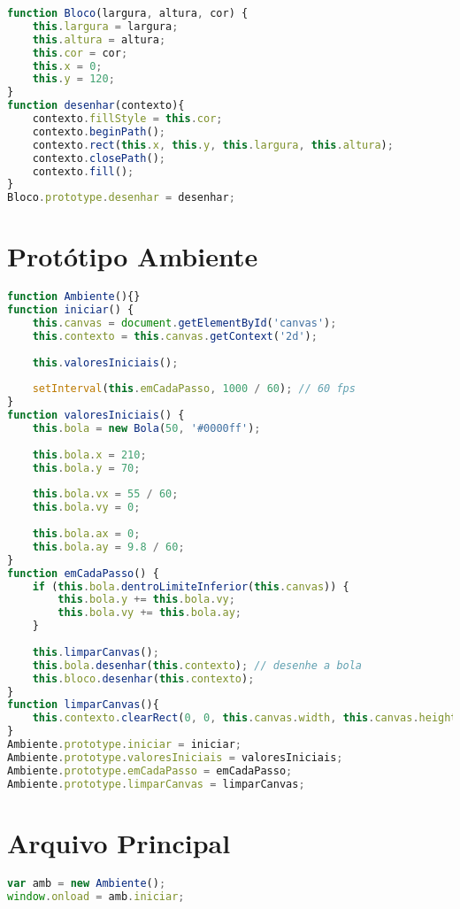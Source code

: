 \documentclass[12pt,a4paper,oneside]{article}
\begin{document}
\begin{lstlisting}[language=JavaScript]
function Bloco(largura, altura, cor) {
	this.largura = largura;
	this.altura = altura;
	this.cor = cor;
	this.x = 0;
	this.y = 120;
}
function desenhar(contexto){    
	contexto.fillStyle = this.cor;
	contexto.beginPath();    
	contexto.rect(this.x, this.y, this.largura, this.altura);
	contexto.closePath();
	contexto.fill();
}
Bloco.prototype.desenhar = desenhar;
\end{lstlisting}

\section*{Protótipo Ambiente}

\begin{lstlisting}[language=JavaScript]
function Ambiente(){}
function iniciar() {    
	this.canvas = document.getElementById('canvas');
	this.contexto = this.canvas.getContext('2d');
	
	this.valoresIniciais();
	
	setInterval(this.emCadaPasso, 1000 / 60); // 60 fps
}
function valoresIniciais() {
	this.bola = new Bola(50, '#0000ff');
	
	this.bola.x = 210;
	this.bola.y = 70;
	
	this.bola.vx = 55 / 60;
	this.bola.vy = 0;
	
	this.bola.ax = 0;
	this.bola.ay = 9.8 / 60;
}
function emCadaPasso() {    
	if (this.bola.dentroLimiteInferior(this.canvas)) {
		this.bola.y += this.bola.vy;
		this.bola.vy += this.bola.ay;
	} 
	
	this.limparCanvas();
	this.bola.desenhar(this.contexto); // desenhe a bola 
	this.bloco.desenhar(this.contexto);
}
function limparCanvas(){
	this.contexto.clearRect(0, 0, this.canvas.width, this.canvas.height);
}
Ambiente.prototype.iniciar = iniciar;
Ambiente.prototype.valoresIniciais = valoresIniciais;
Ambiente.prototype.emCadaPasso = emCadaPasso;
Ambiente.prototype.limparCanvas = limparCanvas;
\end{lstlisting}

\section*{Arquivo Principal}

\begin{lstlisting}[language=JavaScript]
var amb = new Ambiente();
window.onload = amb.iniciar;
\end{lstlisting}
\end{document}
